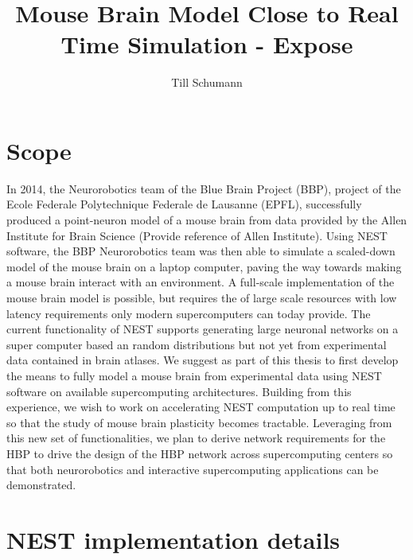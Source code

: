\documentclass[a4paper]{article}
\title{Mouse Brain Model Close to Real Time Simulation - Expose}
\author{Till Schumann}
\begin{document}
   \maketitle


\section{Scope}
In 2014, the Neurorobotics team of the Blue Brain Project (BBP), project of the Ecole Federale Polytechnique Federale de Lausanne (EPFL), successfully produced a point-neuron model
of a mouse brain from data provided by the Allen Institute for Brain Science (Provide reference of Allen Institute).
Using NEST software, the BBP Neurorobotics team was then able to simulate a
scaled-down model of the mouse brain on a laptop computer, paving the way towards
making a mouse brain interact with an environment. A full-scale implementation of
the mouse brain model is possible, but requires the of large scale resources with low latency requirements only modern supercomputers can today provide.
The current functionality of NEST supports  generating large neuronal networks
on a super computer based an random distributions but not yet from experimental data contained in brain atlases. 
We suggest as part of this thesis to first develop the means to fully model a mouse brain from experimental data using NEST software on available supercomputing architectures.
Building from this experience, we wish to work on accelerating NEST computation up to real time so that the study of mouse brain plasticity becomes
tractable. Leveraging from this new set of functionalities, we plan to derive network requirements for the HBP to drive the design
of the HBP network across supercomputing centers so that both neurorobotics and interactive supercomputing applications can be demonstrated.    

\section{NEST implementation details}
\end{document}
